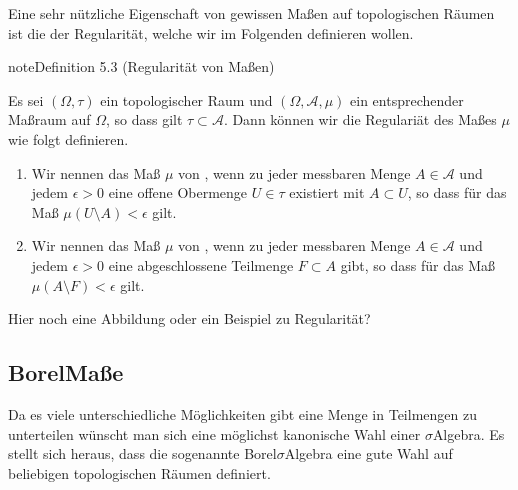\documentclass[letterpaper,10pt,english]{jupyterBook}
\begin{document}
\sphinxAtStartPar
Eine sehr nützliche Eigenschaft von gewissen Maßen auf topologischen Räumen ist die der Regularität, welche wir im Folgenden definieren wollen.
\label{masstheorie/masstheorie:def:regularitaet}
\begin{sphinxadmonition}{note}{Definition 5.3 (Regularität von Maßen)}



\sphinxAtStartPar
Es sei \((\Omega, \tau)\) ein topologischer Raum und \((\Omega, \mathcal{A}, \mu)\) ein entsprechender Maßraum auf \(\Omega\), so dass gilt \(\tau \subset \mathcal{A}\).
Dann können wir die Regulariät des Maßes \(\mu\) wie folgt definieren.
\begin{enumerate}
%
\item {} 
\sphinxAtStartPar
Wir nennen das Maß \(\mu\) von , wenn zu jeder messbaren Menge \(A \in \mathcal{A}\) und jedem \(\epsilon > 0\) eine offene Obermenge \(U \in \tau\) existiert mit \(A \subset U\), so dass für das Maß \(\mu(U\setminus A) < \epsilon\) gilt.

\item {} 
\sphinxAtStartPar
Wir nennen das Maß \(\mu\) von , wenn zu jeder messbaren Menge \(A \in \mathcal{A}\) und jedem \(\epsilon > 0\) eine abgeschlossene Teilmenge \(F \subset A\) gibt, so dass für das Maß \(\mu(A\setminus F) < \epsilon\) gilt.

\end{enumerate}
\end{sphinxadmonition}

\sphinxAtStartPar
Hier noch eine Abbildung oder ein Beispiel zu Regularität?


\subsection{Borel\sphinxhyphen{}Maße}
\label{\detokenize{masstheorie/masstheorie:borel-masze}}
\sphinxAtStartPar
Da es viele unterschiedliche Möglichkeiten gibt eine Menge in Teilmengen zu unterteilen wünscht man sich eine möglichst kanonische Wahl einer \(\sigma\)\sphinxhyphen{}Algebra.
Es stellt sich heraus, dass die sogenannte Borel\sphinxhyphen{}\(\sigma\)\sphinxhyphen{}Algebra eine gute Wahl auf beliebigen topologischen Räumen definiert.
\end{document}
